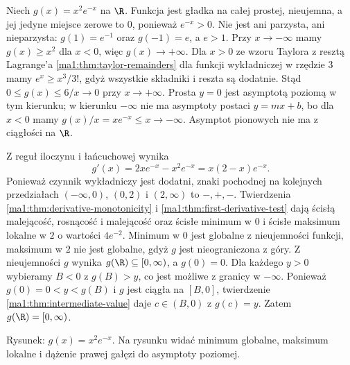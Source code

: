 \begin{przyklad}
\label{ma1:ex:variation-exp}
Niech $g(x)=x^2e^{-x}$ na $\R$. Funkcja jest gładka na całej prostej, nieujemna, a jej jedyne miejsce zerowe to $0$, ponieważ $e^{-x}>0$. Nie jest ani parzysta, ani nieparzysta: $g(1)=e^{-1}$ oraz $g(-1)=e$, a $e>1$. Przy $x\to-\infty$ mamy $g(x)\ge x^2$ dla $x<0$, więc $g(x)\to+\infty$. Dla $x>0$ ze wzoru Taylora z resztą Lagrange'a \ref{ma1:thm:taylor-remainders} dla funkcji wykładniczej w rzędzie $3$ mamy $e^x\ge x^3/3!$, gdyż wszystkie składniki i reszta są dodatnie. Stąd $0\le g(x)\le 6/x\to0$ przy $x\to+\infty$. Prosta $y=0$ jest asymptotą poziomą w tym kierunku; w kierunku $-\infty$ nie ma asymptoty postaci $y=mx+b$, bo dla $x<0$ mamy $g(x)/x=xe^{-x}\le x\to-\infty$. Asymptot pionowych nie ma z ciągłości na $\R$.

Z reguł iloczynu i łańcuchowej wynika
\[
 g'(x)=2xe^{-x}-x^2e^{-x}=x(2-x)e^{-x}.
\]
Ponieważ czynnik wykładniczy jest dodatni, znaki pochodnej na kolejnych przedziałach $( -\infty,0)$, $(0,2)$ i $(2,\infty)$ to $-,+,-$. Twierdzenia \ref{ma1:thm:derivative-monotonicity} i \ref{ma1:thm:first-derivative-test} dają ścisłą malejącość, rosnącość i malejącość oraz ścisłe minimum w $0$ i ścisłe maksimum lokalne w $2$ o wartości $4e^{-2}$. Minimum w $0$ jest globalne z nieujemności funkcji, maksimum w $2$ nie jest globalne, gdyż $g$ jest nieograniczona z góry. Z nieujemności $g$ wynika $g(\R)\subseteq[0,\infty)$, a $g(0)=0$. Dla każdego $y>0$ wybieramy $B<0$ z $g(B)>y$, co jest możliwe z granicy w $-\infty$. Ponieważ $g(0)=0<y<g(B)$ i $g$ jest ciągła na $[B,0]$, twierdzenie \ref{ma1:thm:intermediate-value} daje $c\in(B,0)$ z $g(c)=y$. Zatem $g(\R)=[0,\infty)$.
\end{przyklad}
\begin{center}

\small Rysunek: $g(x)=x^2e^{-x}$. Na rysunku widać minimum globalne, maksimum lokalne i dążenie prawej gałęzi do asymptoty poziomej.
\end{center}
